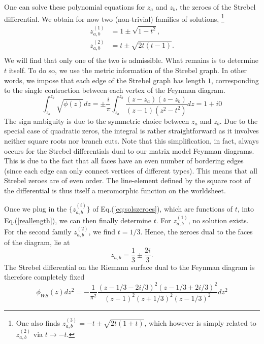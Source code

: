 \documentclass[english]{article}
\newcommand\be{\begin{equation}}
\newcommand\ee{\end{equation}}
\newcommand{\inv}{\frac{1}}
\renewcommand{\>}{\rangle}
\newcommand{\<}{\langle}
\renewcommand{\(}{\left(}
\renewcommand{\)}{\right)}
\begin{document}
One can solve these polynomial equations for $z_{a}$ and $z_{b}$, the zeroes of the Strebel differential. We obtain for now two (non-trivial) families of solutions, \footnote{ One also finds $z^{(3)}_{a, b} = -t \pm \sqrt{2t(1+t)}$, which however is simply related to $z^{(2)}_{a, b}$ via $t \rightarrow -t$.}
\begin{equation} \label{eq:solszeroes}
    \begin{split}
    z^{(1)}_{a,b} &= 1\pm \sqrt{1-t^2},\\
    z^{(2)}_{a, b} &= t\pm \sqrt{2t(t-1)}.\\
    \end{split}
\end{equation}
We will find that only one of the two is admissible. What remains is to determine $t$ itself. To do so, we use the metric information of the Strebel graph. In other words, we impose that each edge of the Strebel graph has length $1$, corresponding to the single contraction between each vertex of the Feynman diagram. 
\be \label{reallength}
\int_{z_{a}}^{z_{b}} \sqrt{\phi(z)}dz = \pm \frac{i}{\pi} \int_{z_{a}}^{z_{b}} \frac{(z-z_{a})(z-z_{b})}{(z-1)(z^2-t^2)}dz = 1 + i0
\ee 
The sign ambiguity is due to the symmetric choice between $z_{a}$ and $z_{b}$. Due to the special case of quadratic zeros, the integral is rather straightforward as it involves neither square roots nor branch cuts. Note that this simplification, in fact, always occurs for the Strebel differentials dual to our matrix model Feynman diagrams. This is due to the fact that all faces have an even number of bordering edges (since each edge can only connect vertices of different types). This means that all Strebel zeroes are of even order. The line-element defined by the square root of the differential is thus itself a meromorphic function on the worldsheet.

Once we plug in the $\{z^{(i)}_{a, b}\}$ of Eq.(\ref{eq:solszeroes}), which are functions of $t$, into Eq.(\ref{reallength}), we can then finally determine $t$. For $z^{(1)}_{a,b}$, no solution exists. For the second family $z^{(2)}_{a,b}$, we find $t=1/3$. Hence, the zeroes dual to the faces of the diagram, lie at 
\be 
z_{a,b} = \inv{3} \pm \frac{2i}{3}.
\ee 
The Strebel differential on the Riemann surface dual to the Feynman diagram is therefore completely fixed
\be 
\phi_{WS}(z) dz^2 = -\inv{\pi^2} \frac{(z- 1/3 - 2i/3)^2(z-1/3 +2i/3)^2}{(z-1)^2(z + 1/3)^2(z-1/3)^2}dz^2 \label{eq:ExplicitStrebel}
\ee 
\end{document}
